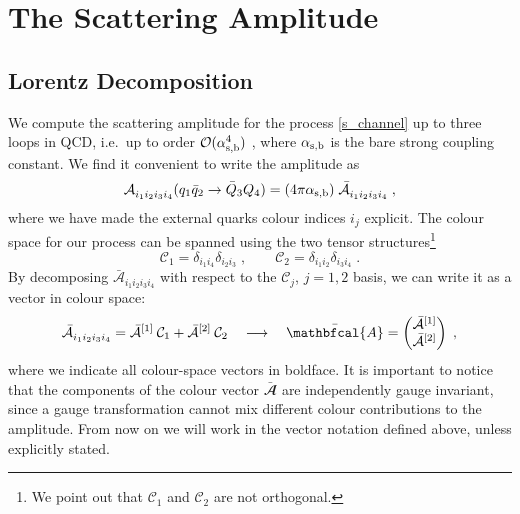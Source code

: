 
\section{The Scattering Amplitude}\label{The Scattering Amplitude}

\subsection{Lorentz Decomposition} 

We compute the scattering amplitude for the process \eqref{s_channel}
up to three loops in QCD, i.e.\ up
to order $\mathcal{O}(\alpha_\mathrm{s,b}^4)$ , where $\alpha_\mathrm{s,b}$ is the bare strong coupling constant.  
We find it convenient to write the amplitude as 
\begin{equation}\label{definition_A_bar}
\tensor{\mathcal{A}}{_{i_1} _{i_2} _{i_3} _{i_4}} (q_1\bar q_2 \rightarrow \bar Q_3  Q_4)  =  ( 4 \pi \asb ) \;  \tensor{\bar{\mathcal{A}}}{_{i_1} _{i_2} _{i_3} _{i_4}}  \; ,
\end{equation}
where we have made the external quarks colour indices $i_j$ explicit.
The colour space for our process can be spanned
using the two tensor structures\footnote{We point out that $\mathcal C_1$ and
  $\mathcal C_2$ are not orthogonal.}
\begin{equation}\label{colour_structures}
\mathcal{C}_1 = {\delta}_{ i_1 i_4} {\delta}_{ i_2 i_3}
\;, \quad\quad  \mathcal{C}_2 = {\delta}_{ i_1 i_2} {\delta}_{ i_3 i_4}\;.
\end{equation}
By decomposing $\bar{\mathcal{A}}_{i_1i_2i_3i_4} $ with respect to the
$\mathcal{C}_j$, $j=1,2$ basis, we can write it as a vector in
colour space:
\begin{equation}
\tensor{\bar{\mathcal{A}}}{_{i_1} _{i_2} _{i_3} _{i_4}}  =  \bar{\mathcal{A}}^{[1]} \: \mathcal{C}_1  +  \bar{\mathcal{A}}^{[2]} \: \mathcal{C}_2        \quad \longrightarrow \quad \bar{\mathbfcal{A}}  = \begin{pmatrix}
\bar{\mathcal{A}}^{[1]} \\
\bar{\mathcal{A}}^{[2]}
\end{pmatrix} \; ,
\end{equation}
where we indicate all colour-space vectors in boldface.
It is important to notice that the components of the colour vector $\bar{\mathbfcal{A}}$ are independently gauge invariant,  since a gauge transformation cannot mix different colour contributions to the amplitude.  From now on we will work in the vector notation defined above, unless explicitly stated.\\

